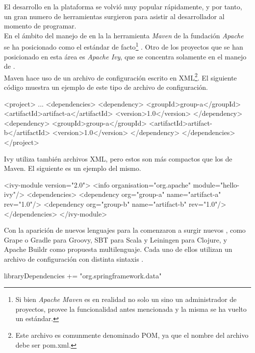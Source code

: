 El desarrollo en la plataforma \java se volvió muy popular rápidamente, y por tanto,
un gran numero de herramientas surgieron para asistir al desarrollador al momento
de programar.\\
En el ámbito del manejo de \dependencies en la \logictier la herramienta \emph{Maven}
de la fundación \emph{Apache} se ha posicionado como el estándar de facto\footnote{
	Si bien \emph{Apache Maven} es en realidad no solo un \depmgr
	sino un administrador de proyectos, provee la funcionalidad antes mencionada y
	la misma se ha vuelto un estándar.
} . Otro de los proyectos que se han posicionado en esta área
es \emph{Apache Ivy}, que se concentra solamente en el manejo de \dependencies.\\
Maven hace uso de un archivo de configuración escrito en XML\footnote{
	Este archivo es comunmente denominado POM, ya que el nombre del archivo debe ser
	pom.xml.
}. El siguiente código
muestra un ejemplo de este tipo de archivo de configuración.
\\
\begin{pomcode}[caption=Configuración de \dependencies en Maven mediante archivo POM]
<project>
	...
	<dependencies>
		<dependency>
			<groupId>group-a</groupId>
			<artifactId>artifact-a</artifactId>
			<version>1.0</version>
		</dependency>
		<dependency>
			<groupId>group-a</groupId>
			<artifactId>artifact-b</artifactId>
			<version>1.0</version>
		</dependency>
	</dependencies>
</project>
\end{pomcode}

Ivy utiliza también archivos XML, pero estos son más compactos que los de Maven.
El siguiente es un ejemplo del mismo.
\\
\begin{ivycode}[caption=Archivo de configuración de Ivy]
<ivy-module version="2.0">
	<info organisation="org.apache" module="hello-ivy"/>
	<dependencies>
		<dependency org="group-a" name="artifact-a" rev="1.0"/>
		<dependency org="group-b" name="artifact-b" rev="1.0"/>
	</dependencies>
</ivy-module>
\end{ivycode}

Con la aparición de nuevos lenguajes para la \jvm comenzaron a surgir nuevos
\depmgrs, como Grape o Gradle para Groovy, SBT para Scala y
Leiningen para Clojure, y Apache Buildr como propuesta multilenguaje. Cada uno
de ellos utilizan un archivo de configuración con
distinta sintaxis .
\\
\begin{javacode}[caption=Dependencia de SpringFramework 3.1.1 para SBT]
libraryDependencies += "org.springframework.data" %
\end{javacode}

